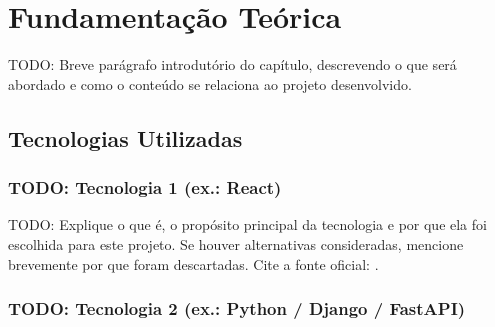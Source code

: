 %
%

\chapter{Fundamentação Teórica}
\label{cap:fundamentacao}

TODO: Breve parágrafo introdutório do capítulo, descrevendo o que será
abordado e como o conteúdo se relaciona ao projeto desenvolvido.


\section{Tecnologias Utilizadas}
\label{sec:tecnologias}



\subsection{TODO: Tecnologia 1 (ex.: React)}
\label{subsec:tech-react}

TODO: Explique o que é, o propósito principal da tecnologia e por que
ela foi escolhida para este projeto. Se houver alternativas consideradas,
mencione brevemente por que foram descartadas. Cite a fonte oficial:
\cite{react2023}.


\subsection{TODO: Tecnologia 2 (ex.: Python / Django / FastAPI)}
\label{subsec:tech-backend}

